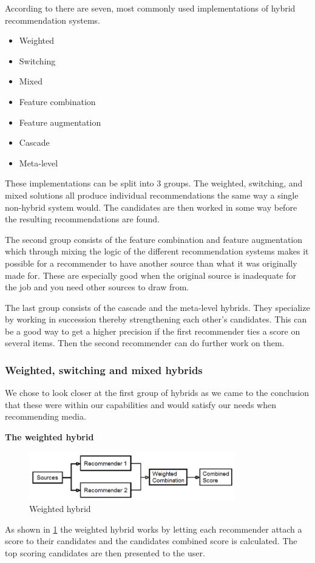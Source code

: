 According to \cite{TheAdaptiveWeb} there are seven, most commonly used implementations of hybrid recommendation systems. 

\begin{itemize}
\item Weighted
\item Switching
\item Mixed
\item Feature combination
\item Feature augmentation
\item Cascade
\item Meta-level
\end{itemize}

These implementations can be split into 3 groups. The weighted, switching, and mixed solutions all produce individual recommendations the same way a single non-hybrid system would. The candidates are then worked in some way before the resulting recommendations are found.

The second group consists of the feature combination and feature augmentation which through mixing the logic of the different recommendation systems makes it possible for a recommender to have another source than what it was originally made for. These are especially good when the original source is inadequate for the job and you need other sources to draw from.

The last group consists of the cascade and the meta-level hybrids. They specialize by working in succession thereby strengthening each other's candidates. This can be a good way to get a higher precision if the first recommender ties a score on several items. Then the second recommender can do further work on them. 

\subsubsection{Weighted, switching and mixed hybrids} 
We chose to look closer at the first group of hybrids as we came to the conclusion that these were within our capabilities and would satisfy our needs when recommending media.\\
\newpage

\textbf{The weighted hybrid}

\begin{figure}[H]
\centering
\includegraphics[width=0.8\textwidth]{Images/Weightedhybrid.png}
\caption{Weighted hybrid}
\label{Weighted}
\end{figure}
As shown in \ref{Weighted} the weighted hybrid works by letting each recommender attach a score to their candidates and the candidates combined score is calculated. The top scoring candidates are then presented to the user. \\

